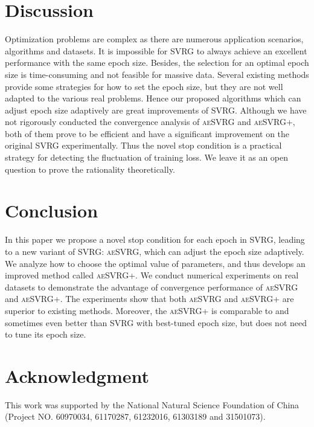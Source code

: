 \documentclass[conference]{IEEEtran}
\begin{document}
\section{Discussion}
\label{discussion}
Optimization problems are complex as there are numerous application scenarios, algorithms and datasets. It is impossible for SVRG to always achieve an excellent performance with the same epoch size. Besides, the selection for an optimal epoch size is time-consuming and not feasible for massive data. Several existing methods provide some strategies for how to set the epoch size, but they are not well adapted to the various real problems. Hence our proposed algorithms which can adjust epoch size adaptively are great improvements of SVRG. Although we have not rigorously conducted the convergence analysis of \textsc{aeSVRG} and \textsc{aeSVRG+}, both of them prove to be efficient and have a significant improvement on the original SVRG experimentally. Thus the novel stop condition is a practical strategy for detecting the fluctuation of training loss. We leave it as an open question to prove the rationality theoretically.

\section{Conclusion}
In this paper we propose a novel stop condition for each epoch in SVRG, leading to a new variant of SVRG: \textsc{aeSVRG}, which can adjust the epoch size adaptively. We analyze how to choose the optimal value of parameters, and thus develops an improved method called \textsc{aeSVRG+}. We conduct numerical experiments on real datasets to demonstrate the advantage of convergence performance of \textsc{aeSVRG} and \textsc{aeSVRG+}. The experiments show that both \textsc{aeSVRG} and \textsc{aeSVRG+} are superior to existing methods. Moreover, the \textsc{aeSVRG+} is comparable to and sometimes even better than SVRG with best-tuned epoch size, but does not need to tune its epoch size.
\label{conclusion}


\section*{Acknowledgment}
This work was  supported by the National Natural Science Foundation of China (Project NO. 60970034, 61170287, 61232016, 61303189 and 31501073).









\end{document}
